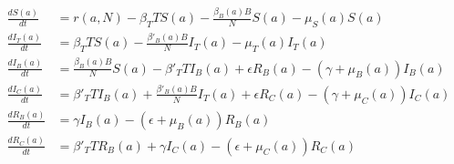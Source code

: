\documentclass[letterpaper,12pt]{article}
\begin{document}
\begin{align*}
\frac{dS(a)}{dt} &= r(a, N) - \beta_{T} T S(a) - \frac{\beta_B (a) B}{N} S(a) - \mu_{S}(a) S(a) \\         
\frac{dI_{T}(a)}{dt}&= \beta_T T S(a) -  \frac{\beta'_{B}(a) B}{N} I_{T}(a) - \mu_{T}(a) I_{T}(a) \\
\frac{dI_{B}(a)}{dt}&=  \frac{\beta_B (a) B}{N}S(a) - \beta'_{T} T I_{B}(a) + \epsilon R_{B}(a)  - (\gamma + \mu_{B}(a)) I_{B}(a) \\
\frac{dI_{C}(a)}{dt}&=  \beta'_{T} T I_{B}(a) + \frac{\beta'_{B}(a) B}{N} I_{T}(a) + \epsilon R_{C}(a)  - (\gamma + \mu_{C}(a)) I_{C}(a)\\  
\frac{dR_{B}(a)}{dt}&=  \gamma I_{B}(a) - (\epsilon + \mu_{B}(a)) R_{B}(a) \\            
\frac{dR_{C}(a)}{dt}&=  \beta'_{T} T R_{B}(a) + \gamma I_{C}(a) - (\epsilon + \mu_{C}(a)) R_{C}(a) \\ 
\end{align*}
\end{document}
